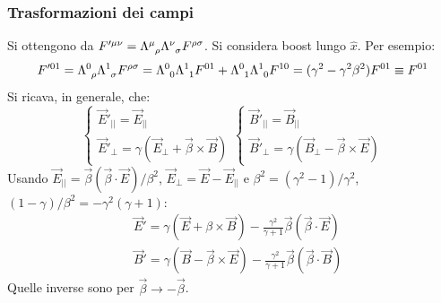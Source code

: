 \documentclass[10pt, a4paper]{scrartcl}
\numberwithin{equation}{subsection}
\theoremstyle{style1}
\begin{document}
\subsubsection{Trasformazioni dei campi}
Si ottengono da $F'^{\mu \nu} = \Lambda\indices{^\mu _\rho} \Lambda\indices{^\nu_\sigma} F^{\rho \sigma } $. Si considera boost lungo $\hat{x}$. Per esempio:
\[
	F'^{01} = \Lambda \indices{^0_ \rho } \Lambda\indices{^1_\sigma } F^{\rho  \sigma } = \Lambda\indices{^{0}_{0}} \Lambda \indices{^{1}_{1}} F^{01} + \Lambda \indices{^{0}_{1}} \Lambda \indices{^{1}_{0}} F^{10} =(\gamma^2 -\gamma^2 \beta ^2) F^{01} \equiv F^{01}  
\] 
Si ricava, in generale, che:
\begin{equation}
	\begin{cases}
		\vec{E}'_{ | |} = \vec{E}_{| |}\\
		\vec{E}'_{\perp} = \gamma(\vec{E}_\perp + \vec{\beta }\times \vec{B})
	\end{cases}
	\begin{cases}
		\vec{B}'_{ | |} = \vec{B}_{| |}\\
		\vec{B}'_{\perp} = \gamma(\vec{B}_\perp - \vec{\beta }\times \vec{E})
	\end{cases}
\end{equation}
Usando $\vec{E}_{| |} = \vec{\beta }(\vec{\beta }\cdot \vec{E}) / \beta ^2  $, $ \vec{E}_\perp = \vec{E}-\vec{E}_{| |} $ e $\beta ^2 = (\gamma^2 -1) / \gamma^2$, $(1-\gamma)/\beta ^2 = - \gamma^2 (\gamma+1)$:
\begin{equation}
	\begin{split}
		&\vec{E}' = \gamma(\vec{E}+\beta \times  \vec{B}) - \frac{\gamma^2}{\gamma+1}\vec{\beta }(\vec{\beta }\cdot \vec{E})\\
		&\vec{B}' = \gamma(\vec{B}-\vec{\beta }\times \vec{E}) - \frac{\gamma^2}{\gamma+1}\vec{\beta }(\vec{\beta }\cdot \vec{B})
	\end{split}
\end{equation}
Quelle inverse sono per $\vec{\beta }\to -\vec{\beta }$. 
\end{document}
